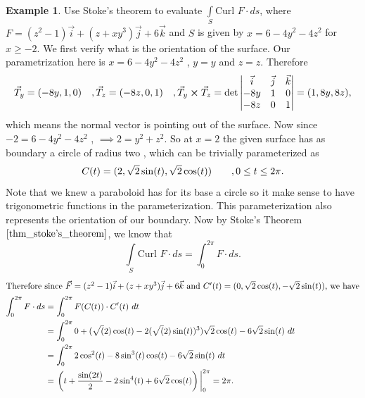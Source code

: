 \documentclass[
	12pt,
	]{article}
\theoremstyle{custom}
\theoremstyle{custom}
\theoremstyle{custom}
\theoremstyle{custom}
\theoremstyle{custom}
\theoremstyle{definition}
\newtheorem{example}{Example}[section]
\theoremstyle{example}
\theoremstyle{note}
\theoremstyle{remark}
\theoremstyle{example}
\newcounter{theo}[section]\setcounter{theo}{0}
\numberwithin{equation}{subsection}
\begin{document}
				\begin{example}
					Use Stoke's theorem to evaluate $\int\limits_{S} \text{Curl } F\cdot ds$, where $F=(z^{2}-1)\vec{i} + (z+xy^{3})\vec{j} + 6\vec{k}$ and $S$ is given by $x= 6-4y^{2} - 4z^{2}$ for $x\ge -2.$
				We first verify what is the orientation of the surface. Our parametrization here is $x = 6-4y^{2} -4z^{2}$ , $y=y$ and $z=z$. Therefore 
				\begin{equation*}
					\vec{T}_{y} = (-8y , 1, 0) \quad , \vec{T}_{z} = (-8z, 0,1) \quad, \vec{T}_{y} \cross \vec{T}_{z} = \det \begin{vmatrix}
						\vec{i} & \vec{j} & \vec{k} \\ 
						-8y & 1 & 0 \\ -8z & 0 & 1
					\end{vmatrix}
					= (1,8y, 8z),
				\end{equation*}
				which means the normal vector is pointing out of the surface. Now since $-2 = 6 - 4y^{2} - 4z^{2}$ , $\implies 2 = y^{2} + z^{2}$. So at $x=2$ the given surface has as boundary a circle of radius two , which can be trivially parameterized as 
				\begin{equation*}
					C(t) = (\-2, \sqrt{2} \sin(t) , \sqrt{2}\cos(t)) \qquad , 0\le t \le 2\pi.
				\end{equation*}
				Note that we knew a paraboloid has for its base a circle so it make sense to have trigonometric functions in the parameterization. This parameterization also represents the orientation of our boundary. Now by Stoke's Theorem $\eqref{thm_stoke's_theorem}$, we know that 
				$$ \int\limits_{S} \text{Curl }F \cdot ds = \int_{0}^{2\pi} F \cdot ds.$$
				\begin{align*}
					\intertext{Therefore since $\vec{F} = (z^{2}-1)\vec{i} + (z+xy^{3})\vec{j} + 6\vec{k}$ and $C'(t) = (0,\sqrt{2}\cos(t) , -\sqrt{2}\sin(t))$, we have}
					\int_{0}^{2\pi} F\cdot ds &=\int_{0}^{2\pi} F(C(t))\cdot C'(t) \ dt\\
					&=\int_{0}^{2\pi} 0 + (\sqrt(2) \cos(t) -2(\sqrt(2) \sin(t))^{3})\sqrt{2}\cos(t) - 6\sqrt{2} \sin(t) \ dt \\
					&= \int_{0}^{2\pi} 2\cos^{2}(t) - 8\sin^{3}(t) \cos(t) - 6\sqrt{2}\sin(t) \ dt \\&= \eval{\left(t + \frac{\sin(2t)}{2} - 2\sin^{4}(t) + 6\sqrt{2}\cos(t)\right)}_{0}^{2\pi} = 2\pi.
				\end{align*}
				\end{example}
\end{document}
